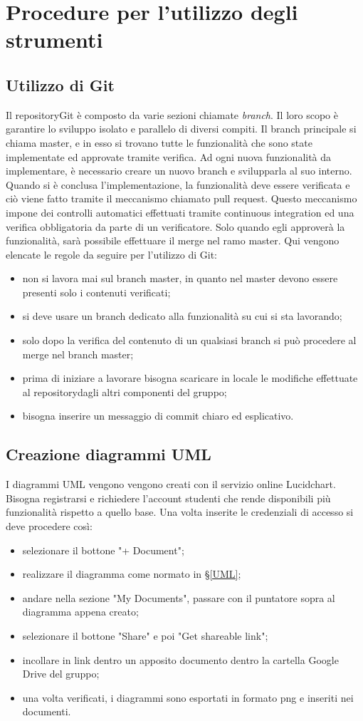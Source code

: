\section{Procedure per l'utilizzo degli strumenti}
\subsection{Utilizzo di Git}
Il repository\glosp Git è composto da varie sezioni chiamate \textit{branch}. Il loro scopo è garantire lo sviluppo isolato e parallelo di diversi compiti. Il branch principale si chiama master, e in esso si trovano tutte le funzionalità che sono state implementate ed approvate tramite verifica. Ad ogni nuova funzionalità da implementare, è necessario creare un nuovo branch e svilupparla al suo interno. Quando si è conclusa l'implementazione, la funzionalità deve essere verificata e ciò viene fatto tramite il meccanismo chiamato pull request. Questo meccanismo impone dei controlli automatici effettuati tramite continuous integration ed una verifica obbligatoria da parte di un verificatore. Solo quando egli approverà la funzionalità, sarà possibile effettuare il merge nel ramo master.
Qui vengono elencate le regole da seguire per l'utilizzo di Git:
\begin{itemize}
	\item non si lavora mai sul branch master, in quanto nel master devono essere presenti solo i contenuti verificati;
	\item si deve usare un branch dedicato alla funzionalità su cui si sta lavorando;
	\item solo dopo la verifica del contenuto di un qualsiasi branch si può procedere al merge nel branch master;
	\item prima di iniziare a lavorare bisogna scaricare in locale le modifiche effettuate al repository\glosp dagli altri componenti del gruppo;
	\item bisogna inserire un messaggio di commit chiaro ed esplicativo.
\end{itemize}
\subsection{Creazione diagrammi UML}
I diagrammi UML vengono vengono creati con il servizio online Lucidchart. Bisogna registrarsi e richiedere l'account studenti che rende disponibili più funzionalità rispetto a quello base. Una volta inserite le credenziali di accesso si deve procedere così:
\begin{itemize}
	\item selezionare il bottone "+ Document";
	\item realizzare il diagramma come normato in §\ref{UML};
	\item andare nella sezione "My Documents", passare con il puntatore sopra al diagramma appena creato;
	\item selezionare il bottone "Share" e poi "Get shareable link";
	\item incollare in link dentro un apposito documento dentro la cartella Google Drive del gruppo;
	\item una volta verificati, i diagrammi sono esportati in formato png e inseriti nei documenti.
\end{itemize}
